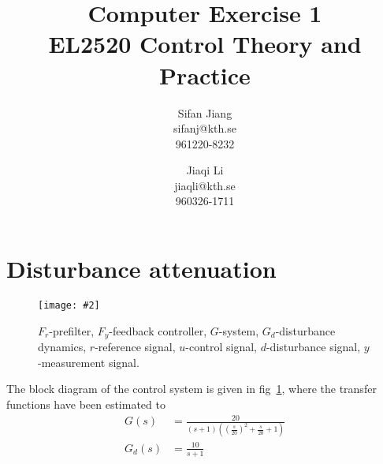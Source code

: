 \documentclass[11pt,a4paper]{article}
\title{
	Computer Exercise 1\\
	EL2520 Control Theory and Practice
}
\author{
	Sifan Jiang\\
	sifanj@kth.se\\
	961220-8232
	\and
	Jiaqi Li\\
	jiaqli@kth.se\\
	960326-1711
}
\newcommand{\image}[3]{
	\begin{figure}[!ht]
		\centering
	    \texttt{[image: \#2]}
		\caption{#3}
		\label{fig:#2}
	\end{figure}
}
\begin{document}
\maketitle

% 

\section{Disturbance attenuation}
\image{0.75}{system2}{$F_{r}$-prefilter, $F_{y}$-feedback controller, $G$-system, $G_{d}$-disturbance dynamics, $r$-reference signal, $u$-control signal, $d$-disturbance signal, $y$-measurement signal.}

\par The block diagram of the control system is given in fig~\ref{fig:system2}, where the transfer functions have been estimated to
\begin{align*}
	G(s) &= \frac{20}{(s+1)((\frac{s}{20})^{2}+\frac{s}{20}+1)} \\
	G_{d}(s) &= \frac{10}{s+1}
\end{align*}
\end{document}
